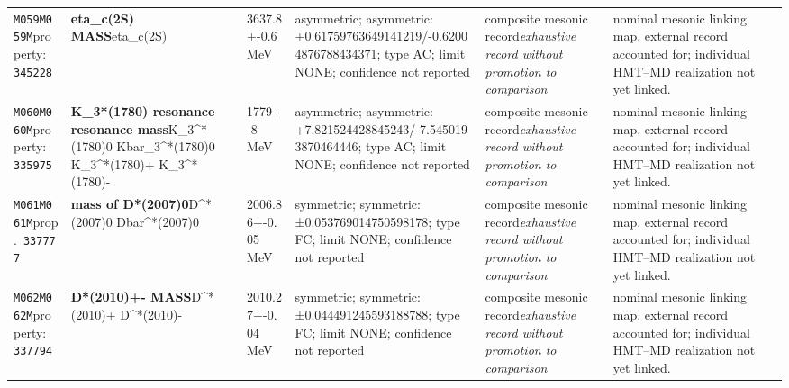 \begin{landscape}
\begin{longtable}{L{1.85cm}L{4.45cm}L{2.35cm}L{4.05cm}L{3.35cm}L{7.15cm}}
\texttt{M059}\newline \texttt{M059M}\newline property:\ \texttt{345228} & \textbf{eta\_\allowbreak{}c(2S) MASS}\newline eta\_\allowbreak{}c(2S) & 3637.8+-0.6\,MeV & asymmetric; asymmetric: +0.61759763649141219/-0.62004876788434371; type AC; limit NONE; confidence not reported & composite mesonic record\newline \emph{exhaustive record without promotion to comparison} & nominal mesonic linking map. external record accounted for; individual HMT--MD realization not yet linked. \\
\texttt{M060}\newline \texttt{M060M}\newline property:\ \texttt{335975} & \textbf{K\_\allowbreak{}3*(1780) resonance resonance mass}\newline K\_\allowbreak{}3\textasciicircum{}*(1780)0 \textbar{}\allowbreak{} Kbar\_\allowbreak{}3\textasciicircum{}*(1780)0 \textbar{}\allowbreak{} K\_\allowbreak{}3\textasciicircum{}*(1780)+ \textbar{}\allowbreak{} K\_\allowbreak{}3\textasciicircum{}*(1780)- & 1779+-8\,MeV & asymmetric; asymmetric: +7.821524428845243/-7.5450193870464446; type AC; limit NONE; confidence not reported & composite mesonic record\newline \emph{exhaustive record without promotion to comparison} & nominal mesonic linking map. external record accounted for; individual HMT--MD realization not yet linked. \\
\texttt{M061}\newline \texttt{M061M}\newline prop.\ \texttt{337777} & \textbf{mass of D*(2007)0}\newline D\textasciicircum{}*(2007)0 \textbar{}\allowbreak{} Dbar\textasciicircum{}*(2007)0 & 2006.86+-0.05\,MeV & symmetric; symmetric: ±0.053769014750598178; type FC; limit NONE; confidence not reported & composite mesonic record\newline \emph{exhaustive record without promotion to comparison} & nominal mesonic linking map. external record accounted for; individual HMT--MD realization not yet linked. \\
\texttt{M062}\newline \texttt{M062M}\newline property:\ \texttt{337794} & \textbf{D*(2010)+- MASS}\newline D\textasciicircum{}*(2010)+ \textbar{}\allowbreak{} D\textasciicircum{}*(2010)- & 2010.27+-0.04\,MeV & symmetric; symmetric: ±0.044491245593188788; type FC; limit NONE; confidence not reported & composite mesonic record\newline \emph{exhaustive record without promotion to comparison} & nominal mesonic linking map. external record accounted for; individual HMT--MD realization not yet linked. \\

\end{longtable}
\end{landscape}
